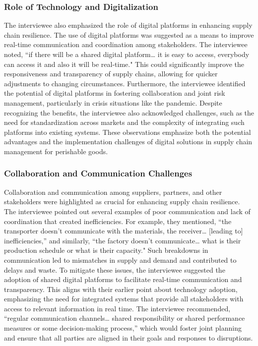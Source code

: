\subsubsection{Role of Technology and Digitalization}
The interviewee also emphasized the role of digital platforms in enhancing supply chain resilience. The use of digital platforms was suggested as a means to improve real-time communication and coordination among stakeholders. The interviewee noted, “if there will be a shared digital platform… it is easy to access, everybody can access it and also it will be real-time." This could significantly improve the responsiveness and transparency of supply chains, allowing for quicker adjustments to changing circumstances. Furthermore, the interviewee identified the potential of digital platforms in fostering collaboration and joint risk management, particularly in crisis situations like the pandemic. Despite recognizing the benefits, the interviewee also acknowledged challenges, such as the need for standardization across markets and the complexity of integrating such platforms into existing systems. These observations emphasize both the potential advantages and the implementation challenges of digital solutions in supply chain management for perishable goods.

\subsubsection{Collaboration and Communication Challenges}
Collaboration and communication among suppliers, partners, and other stakeholders were highlighted as crucial for enhancing supply chain resilience. The interviewee pointed out several examples of poor communication and lack of coordination that created inefficiencies. For example, they mentioned, “the transporter doesn’t communicate with the materials, the receiver… [leading to] inefficiencies,” and similarly, “the factory doesn’t communicate… what is their production schedule or what is their capacity." Such breakdowns in communication led to mismatches in supply and demand and contributed to delays and waste. To mitigate these issues, the interviewee suggested the adoption of shared digital platforms to facilitate real-time communication and transparency. This aligns with their earlier point about technology adoption, emphasizing the need for integrated systems that provide all stakeholders with access to relevant information in real time. The interviewee recommended, “regular communication channels… shared responsibility or shared performance measures or some decision-making process,” which would foster joint planning and ensure that all parties are aligned in their goals and responses to disruptions.

